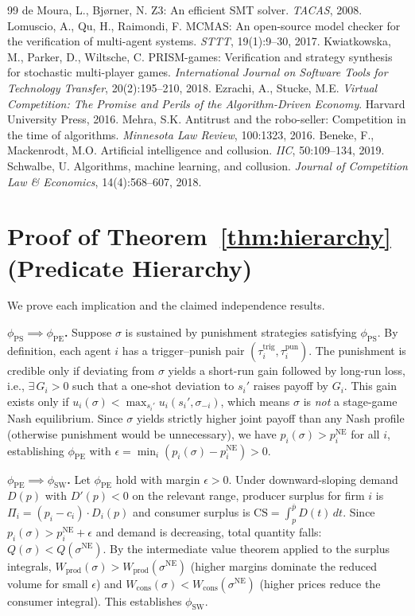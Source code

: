 \documentclass[11pt]{article}
\begin{document}
\begin{thebibliography}{99}
 de Moura, L., Bj{\o}rner, N. Z3: An efficient SMT solver. \emph{TACAS}, 2008.
 Lomuscio, A., Qu, H., Raimondi, F. MCMAS: An open-source model checker for the verification of multi-agent systems. \emph{STTT}, 19(1):9--30, 2017.
 Kwiatkowska, M., Parker, D., Wiltsche, C. PRISM-games: Verification and strategy synthesis for stochastic multi-player games. \emph{International Journal on Software Tools for Technology Transfer}, 20(2):195--210, 2018.
 Ezrachi, A., Stucke, M.E. \emph{Virtual Competition: The Promise and Perils of the Algorithm-Driven Economy}. Harvard University Press, 2016.
 Mehra, S.K. Antitrust and the robo-seller: Competition in the time of algorithms. \emph{Minnesota Law Review}, 100:1323, 2016.
 Beneke, F., Mackenrodt, M.O. Artificial intelligence and collusion. \emph{IIC}, 50:109--134, 2019.
 Schwalbe, U. Algorithms, machine learning, and collusion. \emph{Journal of Competition Law \& Economics}, 14(4):568--607, 2018.
\end{thebibliography}

\appendix
\section{Proof of Theorem~\ref{thm:hierarchy} (Predicate Hierarchy)}

We prove each implication and the claimed independence results.

\medskip\noindent\textbf{$\phi_{\text{PS}} \implies \phi_{\text{PE}}$.}
Suppose $\sigma$ is sustained by punishment strategies satisfying $\phi_{\text{PS}}$. By definition, each agent $i$ has a trigger--punish pair $(\tau_i^{\text{trig}}, \tau_i^{\text{pun}})$. The punishment is credible only if deviating from $\sigma$ yields a short-run gain followed by long-run loss, i.e., $\exists\, G_i > 0$ such that a one-shot deviation to $s_i'$ raises payoff by $G_i$. This gain exists only if $u_i(\sigma) < \max_{s_i'} u_i(s_i', \sigma_{-i})$, which means $\sigma$ is \emph{not} a stage-game Nash equilibrium. Since $\sigma$ yields strictly higher joint payoff than any Nash profile (otherwise punishment would be unnecessary), we have $p_i(\sigma) > p_i^{\text{NE}}$ for all $i$, establishing $\phi_{\text{PE}}$ with $\epsilon = \min_i (p_i(\sigma) - p_i^{\text{NE}}) > 0$.

\medskip\noindent\textbf{$\phi_{\text{PE}} \implies \phi_{\text{SW}}$.}
Let $\phi_{\text{PE}}$ hold with margin $\epsilon > 0$. Under downward-sloping demand $D(p)$ with $D'(p) < 0$ on the relevant range, producer surplus for firm $i$ is $\Pi_i = (p_i - c_i) \cdot D_i(p)$ and consumer surplus is $\text{CS} = \int_{p}^{\bar{p}} D(t)\, dt$. Since $p_i(\sigma) > p_i^{\text{NE}} + \epsilon$ and demand is decreasing, total quantity falls: $Q(\sigma) < Q(\sigma^{\text{NE}})$. By the intermediate value theorem applied to the surplus integrals, $W_{\text{prod}}(\sigma) > W_{\text{prod}}(\sigma^{\text{NE}})$ (higher margins dominate the reduced volume for small $\epsilon$) and $W_{\text{cons}}(\sigma) < W_{\text{cons}}(\sigma^{\text{NE}})$ (higher prices reduce the consumer integral). This establishes $\phi_{\text{SW}}$.
\end{document}
